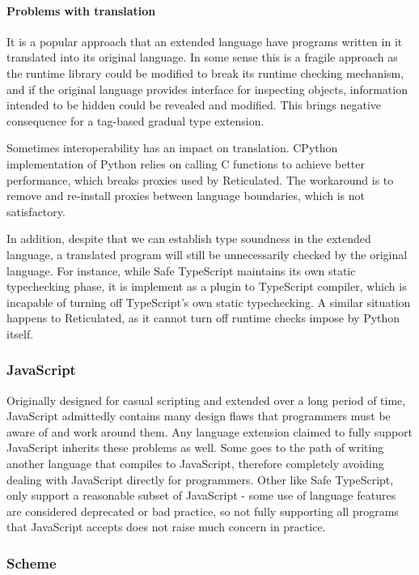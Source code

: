 \paragraph{Problems with translation}
It is a popular approach that an extended language have programs
written in it translated into its original language.
In some sense this is a fragile approach as the runtime library
could be modified to break its runtime checking mechanism,
and if the original language provides interface for inspecting
objects, information intended to be hidden could be
revealed and modified. This brings negative consequence for a tag-based
gradual type extension.

Sometimes interoperability has an impact on translation.
CPython implementation of Python relies on calling C functions to
achieve better performance, which breaks proxies used by Reticulated.
The workaround is to remove and re-install proxies
between language boundaries, which is not satisfactory.

In addition,
despite that we can establish type soundness in the extended language,
a translated program will still be unnecessarily checked by the original language.
For instance,
while Safe TypeScript maintains its own static typechecking phase,
it is implement as a plugin to TypeScript compiler,
which is incapable of turning off TypeScript's own static typechecking.
A similar situation happens to Reticulated, as it cannot turn off
runtime checks impose by Python itself.

\subsubsection{JavaScript}

Originally designed for casual scripting and extended over a long period of time,
JavaScript admittedly contains many design flaws that
programmers must be aware of and work around them.
Any language extension claimed to fully support JavaScript inherits these problems as well.
Some goes to the path of writing another language that compiles to JavaScript,
therefore completely avoiding dealing with JavaScript directly for programmers.
Other like Safe TypeScript, only support a reasonable subset of JavaScript -
some use of language features are considered deprecated or bad practice,
so not fully supporting all programs that JavaScript accepts does not raise
much concern in practice.

\subsubsection{Scheme}

